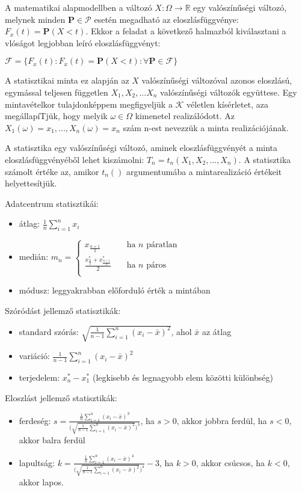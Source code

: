 A matematikai alapmodellben a változó $X: \Omega \rightarrow \mathbb{R}$ egy valószínűségi változó, melynek minden $\mathbf{P} \in \mathcal{P}$ esetén megadható az eloszlásfüggvénye: $F_x(t)=\mathbf{P}(X<t)$. Ekkor a feladat a következő halmazból kiválasztani a vlóságot legjobban leíró eloszlásfüggvényt:

$\mathcal{F}=\{F_x(t):F_x(t)=\mathbf{P}(X<t): \forall \mathbf{P} \in \mathcal{F}\}$

A statisztikai minta ez alapján az $X$ valószínűségi változóval azonos eloszlású, egymással teljesen független $X_1, X_2, ... X_n$ valószínűségi változók együttese. Egy mintavételkor tulajdonképpem megfigyeljük a $\mathcal{K}$ véletlen kísérletet, aza megállapíTjük, hogy melyik $\omega \in \Omega$ kimenetel realizálódott. Az $X_1(\omega)=x_1, ..., X_n(\omega)=x_n$ szám n-est nevezzük a minta realizációjának.

A statisztika egy valószínűségi változó, aminek eloszlásfüggvényét a minta eloszlásfüggvényéből lehet kiszámolni: $T_n=t_n(X_1,X_2,...,X_n)$. A statisztika számolt értéke az, amikor $t_n()$ argumentumába a mintarealizáció értékeit helyettesítjük.

Adatcentrum statisztikái:
\begin{itemize}
\item átlag: $\displaystyle\frac{1}{n} \sum_{i=1}^n x_i$
\item medián: $ m_n =
  \begin{cases}
    x_\frac{n+1}{2}       & \quad \text{ha } n \text{ páratlan}\\
    \frac{x_\frac{n}{2}^*+x_\frac{n+1}{2}^*}{2}  & \quad \text{ha } n \text{ páros}\\
  \end{cases}
$
\item módusz: leggyakrabban előforduló érték a mintában
\end{itemize}

Szóródást jellemző statisztikák:
\begin{itemize}
\item standard szórás: $\sqrt{\frac{1}{n-1}\sum_{i=1}^n(x_i - \bar{x})^2}$, ahol $\bar{x}$ az átlag
\item variáció: $\frac{1}{n-1}\sum_{i=1}^n(x_i - \bar{x})^2$
\item terjedelem: $x_n^*-x_1^*$ (legkisebb és legnagyobb elem közötti különbség)
\end{itemize}

Eloszlást jellemző statisztikák:
\begin{itemize}
\item ferdeség: $s=\frac{\frac{1}{n}\sum_{i=1}^n(x_i-\bar{x})^3}{\Big(\sqrt{\frac{1}{n-1}\sum_{i=1}^n(x_i - \bar{x})^2}\Big)^3}$, ha $s>0$, akkor jobbra ferdül, ha $s<0$, akkor balra ferdül
\item lapultság: $k=\frac{\frac{1}{n}\sum_{i=1}^n(x_i-\bar{x})^4}{\Big(\sqrt{\frac{1}{n-1}\sum_{i=1}^n(x_i - \bar{x})^2}\Big)^4}-3$, ha $k>0$, akkor csúcsos, ha $k<0$, akkor lapos.
\end{itemize}

